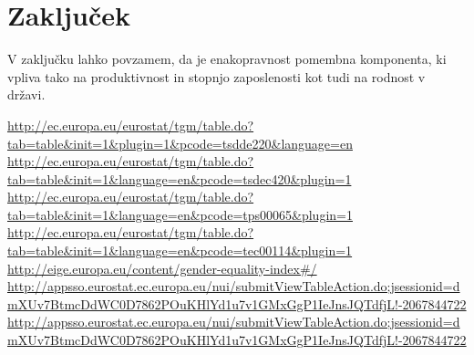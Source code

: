 \documentclass[11pt,a4paper]{article}
\begin{document}
\section{Zaključek}
V zaključku lahko povzamem, da je enakopravnost pomembna komponenta, ki vpliva tako na produktivnost in stopnjo zaposlenosti kot tudi na rodnost v državi.
\begin{thebibliography}{9}
  \url{http://ec.europa.eu/eurostat/tgm/table.do?tab=table&init=1&plugin=1&pcode=tsdde220&language=en}\\
  \url{http://ec.europa.eu/eurostat/tgm/table.do?tab=table&init=1&language=en&pcode=tsdec420&plugin=1}\\
  \url{http://ec.europa.eu/eurostat/tgm/table.do?tab=table&init=1&language=en&pcode=tps00065&plugin=1}\\
  \url{http://ec.europa.eu/eurostat/tgm/table.do?tab=table&init=1&language=en&pcode=tec00114&plugin=1}\\
  \url{http://eige.europa.eu/content/gender-equality-index#/}\\
  \url{http://appsso.eurostat.ec.europa.eu/nui/submitViewTableAction.do;jsessionid=dmXUv7BtmcDdWC0D7862POuKHlYd1u7v1GMxGgP1IeJnsJQTdfjL!-2067844722}\\
  \url{http://appsso.eurostat.ec.europa.eu/nui/submitViewTableAction.do;jsessionid=dmXUv7BtmcDdWC0D7862POuKHlYd1u7v1GMxGgP1IeJnsJQTdfjL!-2067844722}\\
\end{thebibliography}



\end{document}
